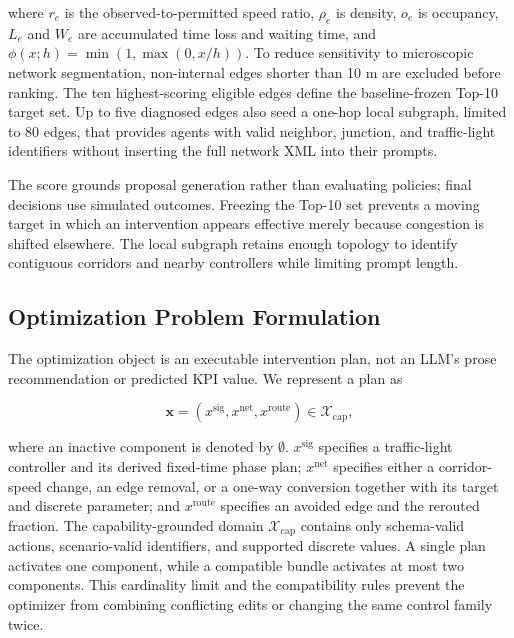 where $r_e$ is the observed-to-permitted speed ratio, $\rho_e$ is density,
$o_e$ is occupancy, $L_e$ and $W_e$ are accumulated time loss and waiting time,
and $\phi(x;h)=\min(1,\max(0,x/h))$.  To reduce sensitivity to microscopic
network segmentation, non-internal edges shorter than 10 m are excluded before
ranking.  The ten highest-scoring eligible edges define the baseline-frozen
Top-10 target set.  Up to five diagnosed edges also seed a
one-hop local subgraph, limited to 80 edges, that provides agents with valid
neighbor, junction, and traffic-light identifiers without inserting the full
network XML into their prompts.

The score grounds proposal generation rather than evaluating policies; final
decisions use simulated outcomes.  Freezing the Top-10 set prevents a moving
target in which an intervention appears effective merely because congestion is
shifted elsewhere.  The local subgraph retains enough topology to identify
contiguous corridors and nearby controllers while limiting prompt length.

\subsection{Optimization Problem Formulation}
\label{sec:optimization-formulation}

The optimization object is an executable intervention plan, not an LLM's prose
recommendation or predicted KPI value.  We represent a plan as

\begin{equation}
\mathbf{x}=
\left(x^{\mathrm{sig}},x^{\mathrm{net}},x^{\mathrm{route}}\right)
\in\mathcal{X}_{\mathrm{cap}},
\label{eq:decision-vector}
\end{equation}

where an inactive component is denoted by $\emptyset$.
$x^{\mathrm{sig}}$ specifies a traffic-light controller and its derived
fixed-time phase plan; $x^{\mathrm{net}}$ specifies either a corridor-speed
change, an edge removal, or a one-way conversion together with its target and
discrete parameter; and $x^{\mathrm{route}}$ specifies an avoided edge and the
rerouted fraction.  The capability-grounded domain
$\mathcal{X}_{\mathrm{cap}}$ contains only schema-valid actions, scenario-valid
identifiers, and supported discrete values.  A single plan activates one
component, while a compatible bundle activates at most two components.  This
cardinality limit and the compatibility rules prevent the optimizer from
combining conflicting edits or changing the same control family twice.

